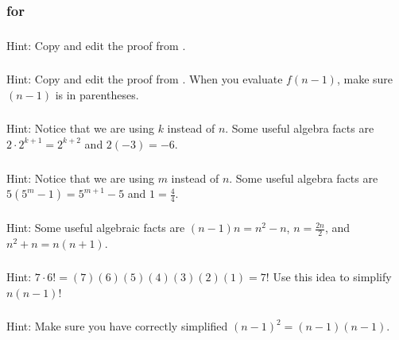 \subsubsection{\answers for 
 \subpffindseq}

\subsubsection*{ \answers}
Hint: Copy and edit the proof from .

\subsubsection*{ \answers}
Hint: Copy and edit the proof from .  When you evaluate $f(n-1)$, make sure $(n-1)$ is in parentheses.

\subsubsection*{ \answers}
Hint: Notice that we are using $k$ instead of $n$.  Some useful algebra facts are $2\cdot 2^{k+1}=2^{k+2}$ and $2(-3)=-6$.

\subsubsection*{ \answers}
Hint: Notice that we are using $m$ instead of $n$. Some useful algebra facts are $5(5^m-1) = 5^{m+1}-5$ and $1 = \frac{4}{4}$.

\subsubsection*{ \answers}
Hint: Some useful algebraic facts are $(n-1)n = n^2-n$, $n = \frac{2n}{2}$, and $n^2+n=n(n+1)$.

\subsubsection*{ \answers}
Hint: $7\cdot 6! = (7)(6)(5)(4)(3)(2)(1)=7!$  Use this idea to simplify $n(n-1)!$

\subsubsection*{ \answers}
Hint: Make sure you have correctly simplified $(n-1)^2=(n-1)(n-1)$.


